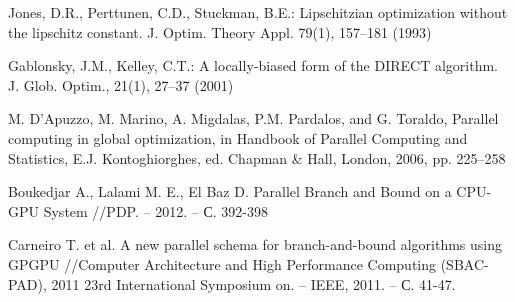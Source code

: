 \documentclass[smallcondensed]{svjour3}     %
\begin{document}
\begin{thebibliography}{}
Jones, D.R., Perttunen, C.D., Stuckman, B.E.: Lipschitzian optimization without the lipschitz constant. J. Optim. Theory Appl. 79(1), 157--181 (1993)

Gablonsky, J.M., Kelley, C.T.: A locally-biased form of the DIRECT algorithm. J. Glob. Optim., 21(1), 27--37 (2001)

M. D’Apuzzo, M. Marino, A. Migdalas, P.M. Pardalos, and G. Toraldo, Parallel computing in global optimization, in Handbook of Parallel Computing and Statistics, E.J. Kontoghiorghes, ed. Chapman \& Hall, London, 2006, pp. 225–258

Boukedjar A., Lalami M. E., El Baz D. Parallel Branch and Bound on a CPU-GPU System //PDP. – 2012. – С. 392-398

Carneiro T. et al. A new parallel schema for branch-and-bound algorithms using GPGPU //Computer Architecture and High Performance Computing (SBAC-PAD), 2011 23rd International Symposium on. – IEEE, 2011. – С. 41-47.

\end{thebibliography}
\end{document}
